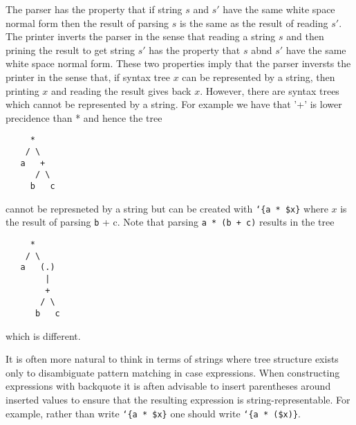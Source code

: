 \documentclass{article}
\newcommand{\mtt}[1]{\mbox{\tt #1}}
\begin{document}
The parser has the property that if string $s$ and $s'$ have the same white space normal form then the result of parsing
$s$ is the same as the result of reading $s'$.  The printer inverts the parser
in the sense that reading a string $s$ and then prining the result to get string $s'$ has the property that $s$ abnd $s'$ have the same white space normal form.
These two properties imply that the parser inversts the printer in the sense that, if syntax tree $x$ can be represented by a string, then printing $x$ and reading the result gives back $x$.
However, there are syntax trees which cannot be represented by a string.  For example we have that '+' is lower precidence than * and hence the tree
\begin{verbatim}
     *
    / \
   a   +
      / \
     b   c
\end{verbatim}
cannot be represneted by a string but can be created with {\tt `\{a * \$x\}} where $x$ is the result of parsing {\mtt b + c}.
Note that parsing {\tt a * (b + c)} results in the tree
\begin{verbatim}
     *
    / \
   a   (.)
        |
        +
       / \
      b   c
\end{verbatim}
which is different.

It is often more natural to think in terms of strings where tree structure exists only to disambiguate
pattern matching in case expressions.  When constructing expressions with backquote it is aften advisable to insert
parentheses around inserted values to ensure that the resulting expression is string-representable.  For example,
rather than write {\tt `\{a * \$x\}} one should write {\tt `\{a * (\$x)\}}.
\end{document}
